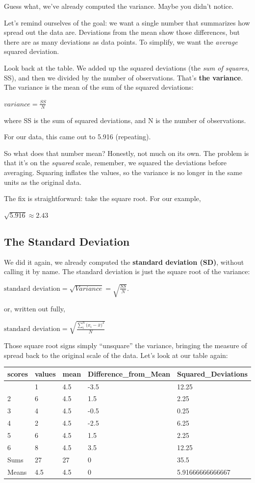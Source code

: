 \documentclass[
  letterpaper,
  DIV=11,
  numbers=noendperiod]{scrreprt}
\begin{document}
Guess what, we've already computed the variance. Maybe you didn't
notice.

Let's remind ourselves of the goal: we want a single number that
summarizes how spread out the data are. Deviations from the mean show
those differences, but there are as many deviations as data points. To
simplify, we want the \emph{average} squared deviation.

Look back at the table. We added up the squared deviations (the
\emph{sum of squares}, SS), and then we divided by the number of
observations. That's \textbf{the variance}. The variance is the mean of
the sum of the squared deviations:

\(variance = \frac{SS}{N}\)

where SS is the sum of squared deviations, and N is the number of
observations.

For our data, this came out to 5.916 (repeating).

So what does that number mean? Honestly, not much on its own. The
problem is that it's on the \emph{squared} scale, remember, we squared
the deviations before averaging. Squaring inflates the values, so the
variance is no longer in the same units as the original data.

The fix is straightforward: take the square root. For our example,

\(\sqrt{5.916} ≈2.43\)

\subsection{The Standard Deviation}\label{the-standard-deviation}

We did it again, we already computed the \textbf{standard deviation
(SD)}, without calling it by name. The standard deviation is just the
square root of the variance:

\(\text{standard deviation} = \sqrt{Variance} = \sqrt{\frac{SS}{N}}\).

or, written out fully,

\(\text{standard deviation} = \sqrt{\frac{\sum_{i}^{n}({x_{i}-\bar{x})^2}}{N}}\)

Those square root signs simply ``unsquare'' the variance, bringing the
measure of spread back to the original scale of the data. Let's look at
our table again:

\begin{longtable}[]{@{}lllll@{}}
\toprule\noalign{}
scores & values & mean & Difference\_from\_Mean & Squared\_Deviations \\
\midrule\noalign{}
\endhead
\bottomrule\noalign{}
\endlastfoot
1 & 1 & 4.5 & -3.5 & 12.25 \\
2 & 6 & 4.5 & 1.5 & 2.25 \\
3 & 4 & 4.5 & -0.5 & 0.25 \\
4 & 2 & 4.5 & -2.5 & 6.25 \\
5 & 6 & 4.5 & 1.5 & 2.25 \\
6 & 8 & 4.5 & 3.5 & 12.25 \\
Sums & 27 & 27 & 0 & 35.5 \\
Means & 4.5 & 4.5 & 0 & 5.91666666666667 \\
\end{longtable}
\end{document}
